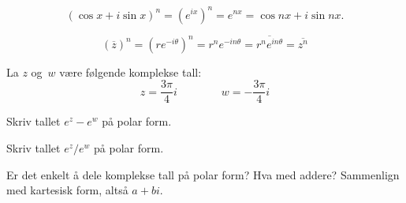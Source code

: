 \begin{losning}
\begin{punkt}
\[
(\cos x + i\sin x)^n=(e^{ix})^n=e^{nx}=\cos nx + i\sin nx.
\]
\end{punkt}

\begin{punkt}
\[
(\overline{z})^n=(re^{-i\theta})^n=r^ne^{-in\theta}=\overline{r^ne^{in\theta}}=\overline{z^n}
\]
%
%
%
\end{punkt}
\end{losning}


\begin{oppgave}
La $z$ og~$w$ være følgende komplekse tall:
\[
z = \frac{3\pi}{4} i
\qquad\qquad
w = -\frac{3\pi}{4}i
\]
\begin{punkt}
Skriv tallet $e^z - e^w$ på polar form.
\end{punkt}

\begin{punkt}
Skriv tallet $e^z/e^w$ på polar form.
\end{punkt}

\begin{punkt}
Er det enkelt å dele komplekse tall på polar form?
Hva med addere?
Sammenlign med kartesisk form, altså $a + bi$.
\end{punkt}

\end{oppgave}


